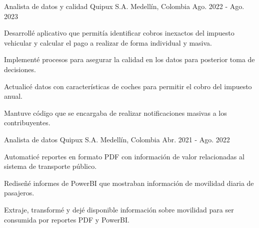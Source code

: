 


\begin{cventries}


\cventry
{Analista de datos y calidad} %
{Quipux S.A.} %
{Medellín, Colombia} %
{Ago. 2022 - Ago. 2023} %
{ %
\begin{cvitems}
\item {Desarrollé aplicativo que permitía identificar cobros inexactos del impuesto vehicular y calcular el pago a realizar de forma individual y masiva.}
\item {Implementé procesos para asegurar la calidad en los datos para posterior toma de decisiones.}
\item {Actualicé datos con características de coches para permitir el cobro del impuesto anual.}
\item {Mantuve código que se encargaba de realizar notificaciones masivas a los contribuyentes.}
\end{cvitems}
}


\cventry
{Analista de datos} %
{Quipux S.A.} %
{Medellín, Colombia   } %
{Abr. 2021 - Ago. 2022} %
{ %
\begin{cvitems}
\item {Automaticé reportes en formato PDF con información de valor relacionadas al sistema de transporte público.}
\item {Rediseñé informes de PowerBI que mostraban información de movilidad diaria de pasajeros.}
\item {Extraje, transformé y dejé disponible información sobre movilidad para ser consumida por reportes PDF y PowerBI.}
\end{cvitems}
}



\end{cventries}
